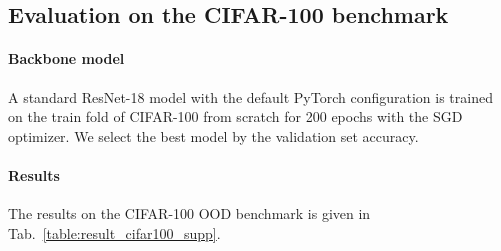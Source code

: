\documentclass[10pt,twocolumn,letterpaper]{article}
\begin{document}
\subsection{Evaluation on the CIFAR-100 benchmark}

\paragraph{Backbone model}
A standard ResNet-18 model with the default PyTorch configuration is trained on the train fold of CIFAR-100 from scratch for 200 epochs with the SGD optimizer. We select the best model by the validation set accuracy.

\paragraph{Results}
The results on the CIFAR-100 OOD benchmark is given in Tab.~\ref{table:result_cifar100_supp}.
\end{document}
